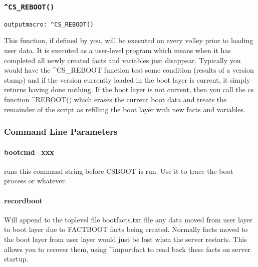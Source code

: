 \documentclass[]{article}
\let\oldparagraph\paragraph
\renewcommand{\paragraph}[1]{\oldparagraph{#1}\mbox{}}
\begin{document}
\subsubsection{\texorpdfstring{\texttt{\^{}CS\_REBOOT()}}{\^{}CS\_REBOOT()}}\label{cs_reboot}

\begin{verbatim}
outputmacro: ^CS_REBOOT()
\end{verbatim}

This function, if defined by you, will be executed on every volley prior
to loading user data. It is executed as a user-level program which means
when it has completed all newly created facts and variables just
disappear. Typically you would have the \^{}CS\_REBOOT function test
some condition (results of a version stamp) and if the version currently
loaded in the boot layer is current, it simply returns having done
nothing. If the boot layer is not current, then you call the cs function
\^{}REBOOT() which erases the current boot data and treats the remainder
of the script as refilling the boot layer with new facts and variables.

\subsubsection{Command Line Parameters}\label{command-line-parameters}

\paragraph{bootcmd=xxx}\label{bootcmdxxx}

runs this command string before CSBOOT is run. Use it to trace the boot
process or whatever.

\paragraph{recordboot}\label{recordboot}

Will append to the toplevel file bootfacts.txt file any data moved from
user layer to boot layer due to FACTBOOT facts being created. Normally
facts moved to the boot layer from user layer would just be lost when
the server restarts. This allows you to recover them, using
\^{}importfact to read back these facts on server startup.
\end{document}
